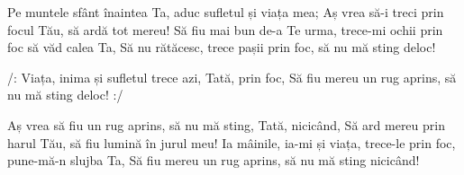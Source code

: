 \beginverse
Pe muntele sfânt înaintea Ta, aduc sufletul și viața mea;
Aș vrea să-i treci prin focul Tău, să ardă tot mereu!
Să fiu mai bun de-a Te urma, trece-mi ochii prin foc să văd calea Ta,
Să nu rătăcesc, trece pașii prin foc, să nu mă sting deloc!
\endverse

\beginchorus
/: Viața, inima și sufletul trece azi, Tată, prin foc,
Să fiu mereu un rug aprins, să nu mă sting deloc! :/
\endchorus

\beginverse
Aș vrea să fiu un rug aprins, să nu mă sting, Tată, nicicând,
Să ard mereu prin harul Tău, să fiu lumină în jurul meu!
Ia mâinile, ia-mi și viața, trece-le prin foc, pune-mă-n slujba Ta,
Să fiu mereu un rug aprins, să nu mă sting nicicând!
\endverse
\endsong